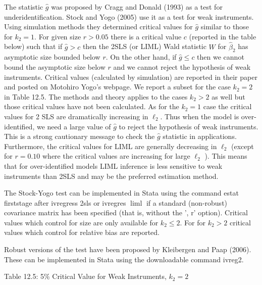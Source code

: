 \documentclass[10pt]{article}
\begin{document}
The statistic $\widehat{g}$ was proposed by Cragg and Donald (1993) as a test for underidentification. Stock and Yogo (2005) use it as a test for weak instruments. Using simulation methods they determined critical values for $\widehat{g}$ similar to those for $k_{2}=1$. For given size $r>0.05$ there is a critical value $c$ (reported in the table below) such that if $\widehat{g}>c$ then the 2SLS (or LIML) Wald statistic $W$ for $\widehat{\beta}_{2}$ has asymptotic size bounded below $r$. On the other hand, if $\widehat{g} \leq c$ then we cannot bound the asymptotic size below $r$ and we cannot reject the hypothesis of weak instruments. Critical values (calculated by simulation) are reported in their paper and posted on Motohiro Yogo's webpage. We report a subset for the case $k_{2}=2$ in Table 12.5. The methods and theory applies to the cases $k_{2}>2$ as well but those critical values have not been calculated. As for the $k_{2}=1$ case the critical values for 2 SLS are dramatically increasing in $\ell_{2}$. Thus when the model is over-identified, we need a large value of $\widehat{g}$ to reject the hypothesis of weak instruments. This is a strong cautionary message to check the $\widehat{g}$ statistic in applications. Furthermore, the critical values for LIML are generally decreasing in $\ell_{2}$ (except for $r=0.10$ where the critical values are increasing for large $\ell_{2}$ ). This means that for over-identified models LIML inference is less sensitive to weak instruments than 2SLS and may be the preferred estimation method.

The Stock-Yogo test can be implemented in Stata using the command estat firststage after ivregress 2sls or ivregres $\operatorname{liml}$ if a standard (non-robust) covariance matrix has been specified (that is, without the ', r' option). Critical values which control for size are only available for $k_{2} \leq 2$. For for $k_{2}>2$ critical values which control for relative bias are reported.

Robust versions of the test have been proposed by Kleibergen and Paap (2006). These can be implemented in Stata using the downloadable command ivreg2.

Table 12.5: 5\% Critical Value for Weak Instruments, $k_{2}=2$
\end{document}
